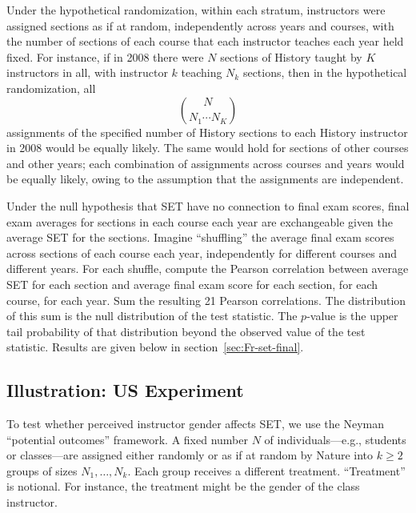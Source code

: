 \documentclass[12pt]{article}
\newcommand{\beq}{\begin{equation}}
\newcommand{\eeq}{\end{equation}}
\begin{document}
Under the hypothetical randomization, within each stratum, instructors
were assigned sections as if at random, independently across years and courses, with
the number of sections of each course that each instructor teaches each year held fixed.
For instance, if in 2008 there were $N$ sections of History taught by $K$ instructors in all,
with instructor $k$ teaching $N_k$ sections, then in the hypothetical randomization,
all
\beq
    {N}\choose{N_1 \cdots N_K}
\eeq
assignments of the specified number of History sections to each History instructor 
in 2008 would be equally likely.
The same would hold for sections of other courses and other years;
each combination of assignments across courses and years would be equally likely,
owing to the assumption that the assignments are independent.

Under the null hypothesis that SET have no connection to final exam scores,
final exam averages for sections in each course each year are exchangeable given the average SET
for the sections.
Imagine ``shuffling'' the average final exam scores across sections of each course
each year, independently
for different courses and different years.
For each shuffle, compute the Pearson correlation between average SET for each section
and average final exam score for each section, for each course, for each year.
Sum the resulting 21 Pearson correlations.
The distribution of this sum is the null distribution of the test statistic.
The $p$-value is the upper tail probability of that distribution beyond the observed value of the 
test statistic.
Results are given below in section~\ref{sec:Fr-set-final}.

\subsection{Illustration: US Experiment}
To test whether perceived instructor gender affects SET,
we use the Neyman ``potential outcomes'' framework.
A fixed number $N$ of individuals---e.g., students or classes---are assigned either
randomly or as if at random by Nature into 
$k \ge 2$ groups of sizes $N_1, \ldots, N_k$.
Each group receives a different treatment.
``Treatment'' is notional. 
For instance, the treatment might be the gender of the
class instructor.
\end{document}
